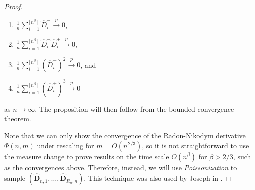 \begin{proof}
\begin{enumerate}
    \item $\frac{1}{n}\sum_{i=1}^{\lfloor n^\beta \rfloor} \widehat{D}_i^-\overset{p}{\to}0 $, 
    \item $\frac{1}{n}\sum_{i=1}^{\lfloor n^\beta \rfloor}\widehat{D}_i^- \widehat{D}_i^+\overset{p}{\to}0$,
    \item $\frac{1}{n}\sum_{i=1}^{\lfloor n^\beta \rfloor}(\widehat{D}_i^-)^2\overset{p}{\to}0$, and 
    \item $\frac{1}{n}\sum_{i=1}^{\lfloor n^\beta \rfloor}(\widehat{D}_i^+)^3\overset{p}{\to}0$
\end{enumerate}
as $n\to \infty$. The proposition will then follow from the bounded convergence theorem.

Note that we can only show the convergence of the Radon-Nikodym derivative $\Phi(n,m)$ under rescaling for $m=O(n^{2/3})$, so it is not straightforward to use the measure change to prove results on the time scale $O(n^\beta)$ for $\beta>2/3$, such as the convergences above. Therefore, instead, we will use \emph{Poissonization} to sample $(\mathbf{\widehat{D}}_{n,1},\dots,\mathbf{\widehat{D}}_{R_n,n})$. This technique was also used by Joseph in \cite{josephComponentSizesCritical2014}. 


\end{proof}
